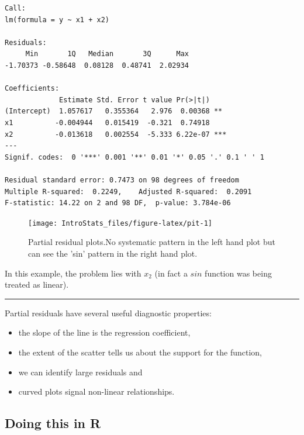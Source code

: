 \documentclass[
  oneside]{krantz}
\providecommand{\tightlist}{%
  \setlength{\itemsep}{0pt}\setlength{\parskip}{0pt}}
\begin{document}
\begin{verbatim}
Call:
lm(formula = y ~ x1 + x2)

Residuals:
     Min       1Q   Median       3Q      Max 
-1.70373 -0.58648  0.08128  0.48741  2.02934 

Coefficients:
             Estimate Std. Error t value Pr(>|t|)    
(Intercept)  1.057617   0.355364   2.976  0.00368 ** 
x1          -0.004944   0.015419  -0.321  0.74918    
x2          -0.013618   0.002554  -5.333 6.22e-07 ***
---
Signif. codes:  0 '***' 0.001 '**' 0.01 '*' 0.05 '.' 0.1 ' ' 1

Residual standard error: 0.7473 on 98 degrees of freedom
Multiple R-squared:  0.2249,    Adjusted R-squared:  0.2091 
F-statistic: 14.22 on 2 and 98 DF,  p-value: 3.784e-06
\end{verbatim}

\begin{figure}

{\centering \texttt{[image: IntroStats\_files/figure-latex/pit-1]} 

}

\caption{Partial residual plots.No systematic pattern in the left hand plot but can see the 'sin' pattern in the right hand plot.}\label{fig:pit}
\end{figure}

In this example, the problem lies with \(x_2\) (in fact a \(sin\) function was being treated as linear).

\begin{center}\rule{0.5\linewidth}{0.5pt}\end{center}

Partial residuals have several useful diagnostic properties:

\begin{itemize}
\tightlist
\item
  the slope of the line is the regression coefficient,
\item
  the extent of the scatter tells us about the support for the function,
\item
  we can identify large residuals and
\item
  curved plots signal non-linear relationships.
\end{itemize}

\hypertarget{doing-this-in-r-30}{%
\subsection{Doing this in R}\label{doing-this-in-r-30}}
\end{document}
